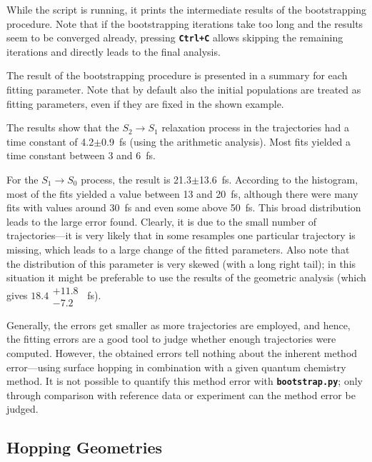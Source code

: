 \documentclass[a4paper,11pt,DIV=15,openany]{scrbook}
\makeatletter
\newcommand{\refermanual}[2][rectangle,draw=B,thick,fill=black!5,inner sep=1pt,outer sep=0pt,rounded corners]{\marginpar{\tikz[baseline=(current bounding box.north)]\node at (0,0) [#1]{\begin{tabular}{@{}l@{}}See\\ section\\ \ref*{#2}\\ (p. \pageref*{#2})\\ in the\\ manual.\end{tabular}};}}
\newcommand{\ttt}[1]{\textbf{\texttt{#1}}}
\makeatother
\begin{document}
\normalsize

While the script is running, it prints the intermediate results of the bootstrapping procedure.
Note that if the bootstrapping iterations take too long and the results seem to be converged already, pressing \ttt{Ctrl+C} allows skipping the remaining iterations and directly leads to the final analysis.

The result of the bootstrapping procedure is presented in a summary for each fitting parameter.
Note that by default also the initial populations are treated as fitting parameters, even if they are fixed in the shown example.

The results show that the $S_2\rightarrow S_1$ relaxation process in the trajectories had a time constant of 4.2$\pm$0.9~fs (using the arithmetic analysis).
Most fits yielded a time constant between 3 and 6~fs.

For the $S_1\rightarrow S_0$ process, the result is 21.3$\pm$13.6~fs.
According to the histogram, most of the fits yielded a value between 13 and 20~fs, although there were many fits with values around 30~fs and even some above 50~fs.
This broad distribution leads to the large error found.
Clearly, it is due to the small number of trajectories---it is very likely that in some resamples one particular trajectory is missing, which leads to a large change of the fitted parameters.
Also note that the distribution of this parameter is very skewed (with a long right tail); in this situation it might be preferable to use the results of the geometric analysis (which gives $18.4\substack{+11.8\\-7.2}$~fs).

Generally, the errors get smaller as more trajectories are employed, and hence, the fitting errors are a good tool to judge whether enough trajectories were computed.
However, the obtained errors tell nothing about the inherent method error---using surface hopping in combination with a given quantum chemistry method.
It is not possible to quantify this method error with \ttt{bootstrap.py}; only through comparison with reference data or experiment can the method error be judged.











\clearpage
\subsection{Hopping Geometries}
\refermanual{m-sec:crossing.py}
\end{document}
